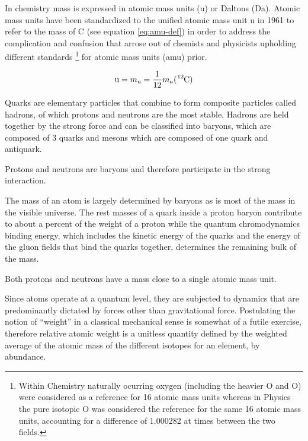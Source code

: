 In chemistry mass is expressed in atomic mass units (\si{\atomicmassunit}) or
Daltons (\si{\dalton}).
Atomic mass units have been standardized to the
unified atomic mass unit \si{\atomicmassunit} in 1961 to refer to the mass of
C (see equation \ref{eq:amu-def}) in order to address the
complication and confusion that arrose out of chemists and physicists
upholding different standards
\footnote{Within Chemistry naturally ocurring oxygen (including the heavier
O and O) were considered as a reference for 16 atomic mass
units whereas in Physics the pure isotopic O was considered the
reference for the same 16 atomic mass units, accounting for a difference of
\num{1.000282} at times between the two fields.} for atomic mass units (amu)
prior.

\begin{equation}\label{eq:amu-def}
  \mathrm {u} =
  m_{\mathrm {u} }=\frac {1}{12} m_a(\mathrm{ \ce{^{12}}C })
\end{equation}

Quarks are elementary particles that combine to form composite particles called
hadrons, of which protons and neutrons are the most stable. Hadrons are held
together by the strong force and can be classified into baryons, which are
composed of 3 quarks and mesons which are composed of one quark and antiquark.

Protons and neutrons are baryons and therefore participate in the strong
interaction.

The mass of an atom is largely determined by baryons as is most of the mass
in the visible universe. The rest masses of a quark inside a proton baryon
contribute to about a percent of the weight of a proton while the quantum
chromodynamics binding energy, which includes the kinetic energy of the quarks
and the energy of the gluon fields that bind the quarks together, determines
the remaining bulk of the mass.

Both protons and neutrons have a mass close to a single atomic mass unit.


Since atoms operate at a quantum level, they are subjected to dynamics that
are predominantly dictated by forces other than gravitational force.
Postulating the notion of ``weight'' in a classical mechanical sense
is somewhat of a futile exercise, therefore relative atomic weight is a
unitless quantity defined by the weighted average of the atomic mass of the
different isotopes for an element, by abundance.

